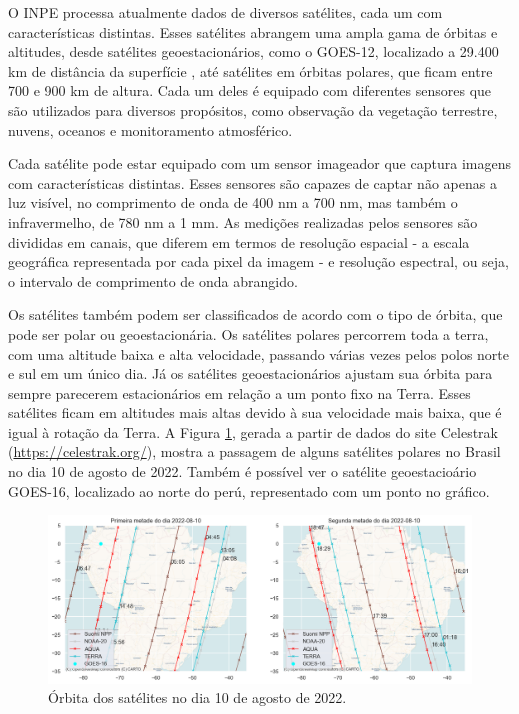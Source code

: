 \documentclass[cic,tc]{iiufrgs}
\begin{document}
O INPE processa atualmente dados de diversos satélites, cada um com características distintas. Esses satélites abrangem uma ampla gama de órbitas e altitudes, desde satélites geoestacionários, como o GOES-12, localizado a 29.400 km de distância da superfície \citep{GOES12Algo}, até satélites em órbitas polares, que ficam entre 700 e 900 km de altura. Cada um deles é equipado com diferentes sensores que são utilizados para diversos propósitos, como observação da vegetação terrestre, nuvens, oceanos e monitoramento atmosférico. \par

Cada satélite pode estar equipado com um sensor imageador que captura imagens com características distintas. Esses sensores são capazes de captar não apenas a luz visível, no comprimento de onda de 400 nm a 700 nm, mas também o infravermelho, de 780 nm a 1 mm. As medições realizadas pelos sensores são divididas em canais, que diferem em termos de resolução espacial - a escala geográfica representada por cada pixel da imagem - e resolução espectral, ou seja, o intervalo de comprimento de onda abrangido. \par

Os satélites também podem ser classificados de acordo com o tipo de órbita, que pode ser polar ou geoestacionária. Os satélites polares percorrem toda a terra, com uma altitude baixa e alta velocidade, passando várias vezes pelos polos norte e sul em um único dia. Já os satélites geoestacionários ajustam sua órbita para sempre parecerem estacionários em relação a um ponto fixo na Terra. Esses satélites ficam em altitudes mais altas devido à sua velocidade mais baixa, que é igual à rotação da Terra. A Figura \ref{fig:orbita2022-08-10}, gerada a partir de dados do site Celestrak (\url{https://celestrak.org/}), mostra a passagem de alguns satélites polares no Brasil no dia 10 de agosto de 2022. Também é possível ver o satélite geoestacioário GOES-16, localizado ao norte do perú, representado com um ponto no gráfico. \par

\begin{figure}[H]
    \caption{Órbita dos satélites no dia 10 de agosto de 2022.}
    \begin{center}
        \includegraphics[width=35em]{orbita2022-08-10}
    \end{center}
    \label{fig:orbita2022-08-10}
\end{figure}
\end{document}
